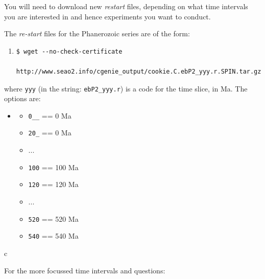 You will need to download new \textit{restart} files, depending on what time intervals you are interested in and hence experiments you want to conduct.

\vspace{2mm}

The \textit{re-start} files for the Phanerozoic series are of the form:

\begin{enumerate}[noitemsep]
\vspace{2mm}
\item[\textbf{[time yyy]:}]
\small\begin{verbatim}
$ wget --no-check-certificate 
   http://www.seao2.info/cgenie_output/cookie.C.ebP2_yyy.r.SPIN.tar.gz
\end{verbatim}\small
\end{enumerate}
\vspace{2mm}

where \texttt{yyy} (in the string: \texttt{ebP2\_yyy.r}) is a code for the time slice, in Ma. The options are:

\vspace{1mm}
\small\begin{itemize}[noitemsep]
\item []
\begin{itemize}[noitemsep]
\item \texttt{0\_\_} == 0 Ma
\item \texttt{20\_} == 0 Ma
\item [] ...
\item \texttt{100} == 100 Ma
\item \texttt{120} == 120 Ma
\item [] ...
\item \texttt{520} == 520 Ma
\item \texttt{540} == 540 Ma
\end{itemize}
\end{itemize}\normalsize
c

For the more focussed time intervals and questions: 


